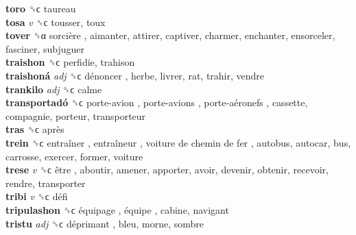 \textbf{toro} ␝ϲ  taureau  \\
\textbf{tosa} \emph{v}  ␝ϲ  tousser, toux  \\
\textbf{tover} ␝α   sorcière , aimanter, attirer, captiver, charmer, enchanter, ensorceler, fasciner, subjuguer  \\
\textbf{traishon} ␝ϲ  perfidie, trahison  \\
\textbf{traishoná} \emph{adj}  ␝ϲ   dénoncer , herbe, livrer, rat, trahir, vendre  \\
\textbf{trankilo} \emph{adj}  ␝ϲ  calme  \\
\textbf{transportadó} ␝ϲ   porte-avion ,  porte-avions ,  porte-aéronefs , cassette, compagnie, porteur, transporteur  \\
\textbf{tras} ␝ϲ   après   \\
\textbf{trein} ␝ϲ   entraîner ,  entraîneur ,  voiture de chemin de fer , autobus, autocar, bus, carrosse, exercer, former, voiture  \\
\textbf{trese} \emph{v}  ␝ϲ   être , aboutir, amener, apporter, avoir, devenir, obtenir, recevoir, rendre, transporter  \\
\textbf{tribi} \emph{v}  ␝ϲ   défi   \\
\textbf{tripulashon} ␝ϲ   équipage ,  équipe , cabine, navigant  \\
\textbf{tristu} \emph{adj}  ␝ϲ   déprimant , bleu, morne, sombre  \\
